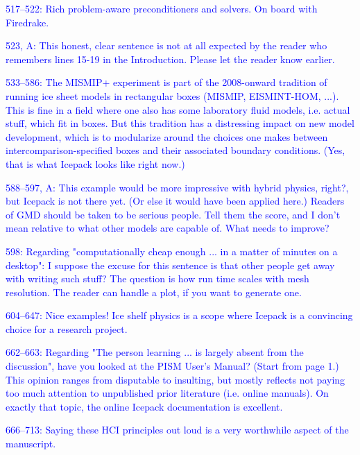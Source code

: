 \documentclass{article}
\theoremstyle{definition}
\theoremstyle{plain}
\begin{document}
\textcolor{blue}{517--522:  Rich problem-aware preconditioners and solvers.  On board with Firedrake.}

\textcolor{blue}{523, A:  This honest, clear sentence is not at all expected by the reader who remembers lines 15-19 in the Introduction.  Please let the reader know earlier.}

\textcolor{blue}{533--586:  The MISMIP+ experiment is part of the 2008-onward tradition of running ice sheet models in rectangular boxes (MISMIP, EISMINT-HOM, ...).  This is fine in a field where one also has some laboratory fluid models, i.e. actual stuff, which fit in boxes.  But this tradition has a distressing impact on new model development, which is to modularize around the choices one makes between intercomparison-specified boxes and their associated boundary conditions.  (Yes, that is what Icepack looks like right now.)}

\textcolor{blue}{588--597, A:  This example would be more impressive with hybrid physics, right?, but Icepack is not there yet.  (Or else it would have been applied here.)  Readers of GMD should be taken to be serious people.  Tell them the score, and I don't mean relative to what other models are capable of.  What needs to improve?}

\textcolor{blue}{598:  Regarding "computationally cheap enough ... in a matter of minutes on a desktop":  I suppose the excuse for this sentence is that other people get away with writing such stuff?  The question is how run time scales with mesh resolution.  The reader can handle a plot, if you want to generate one.}

\textcolor{blue}{604--647:  Nice examples!  Ice shelf physics is a scope where Icepack is a convincing choice for a research project.}

\textcolor{blue}{662--663:  Regarding "The person learning ... is largely absent from the discussion", have you looked at the PISM User's Manual?  (Start from page 1.)  This opinion ranges from disputable to insulting, but mostly reflects not paying too much attention to unpublished prior literature (i.e. online manuals).  On exactly that topic, the online Icepack documentation is excellent.}

\textcolor{blue}{666--713:  Saying these HCI principles out loud is a very worthwhile aspect of the manuscript.}
\end{document}
